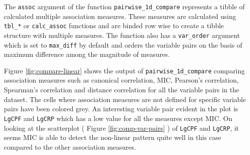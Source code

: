 The \texttt{assoc} argument of the function
\texttt{pairwise\_1d\_compare} represents a tibble of calculated
multiple association measures. These measures are calculated using
\texttt{tbl\_*} or \texttt{calc\_assoc} functions and are binded row
wise to create a tibble structure with multiple measures. The function
also has a \texttt{var\_order} argument which is set to
\texttt{max\_diff} by default and orders the variable pairs on the basis
of maximum difference among the magnitude of measures.

Figure \ref{fig:compare-linear} shows the output of
\texttt{pairwise\_1d\_compare} comparing association measures such as
canonical correlation, MIC, Pearson's correlation, Spearman's
correlation and distance correlation for all the variable pairs in the
dataset. The cells where association measures are not defined for
specific variable pairs have been colored grey. An interesting variable
pair evident in the plot is \texttt{LgCPF} and \texttt{LgCRP} which has
a low value for all the measures except MIC. On looking at the
scatterplot ( Figure \ref{fig:comp-var-pairs} ) of \texttt{LgCPF} and
\texttt{LgCRP}, it seems MIC is able to detect the non-linear pattern
quite well in this case compared to the other association measures.


